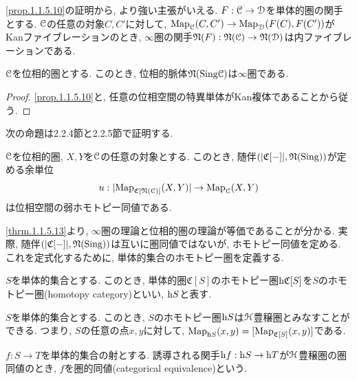 \documentclass[uplatex, a4paper, 14Q, dvipdfmx]{jsreport}
\begin{document}
\begin{remark} \label{rem.1.1.5.11}
  \cref{prop.1.1.5.10}の証明から, より強い主張がいえる.
  $F : \mathcal{C} \to \mathcal{D}$を単体的圏の関手とする. 
  $\mathcal{C}$の任意の対象$C,C'$に対して, $\mathrm{Map}_{\mathcal{C}}(C,C') \to \mathrm{Map}_{\mathcal{D}}(F(C),F(C'))$がKanファイブレーションのとき, $\infty$圏の関手$\mathfrak{N}(F) : \mathfrak{N}(\mathcal{C}) \to \mathfrak{N}(\mathcal{D})$は内ファイブレーションである.  
\end{remark}

\begin{corollary} \label{cor.1.1.5.12}
  $\mathcal{C}$を位相的圏とする. 
  このとき, 位相的脈体$\mathfrak{N}(\mathrm{Sing}\mathcal{C})$は$\infty$圏である.
\end{corollary}

\begin{proof}
  \cref{prop.1.1.5.10}と, 任意の位相空間の特異単体がKan複体であることから従う.
\end{proof}

次の命題は2.2.4節と2.2.5節で証明する. 

\begin{theorem} \label{thrm.1.1.5.13}
  $\mathcal{C}$を位相的圏, $X,Y$を$\mathcal{C}$の任意の対象とする. 
  このとき, 随伴$(|\mathfrak{C}[-]|, \mathfrak{N}(\mathrm{Sing}))$が定める余単位
  \begin{align*}
    u : |\mathrm{Map}_{\mathfrak{C}[\mathfrak{N}(\mathcal{C})]}(X,Y)| \to \mathrm{Map}_{\mathcal{C}}(X,Y)
  \end{align*}
  は位相空間の弱ホモトピー同値である. 
\end{theorem}

\cref{thrm.1.1.5.13}より, $\infty$圏の理論と位相的圏の理論が等価であることが分かる. 
実際, 随伴$(|\mathfrak{C}[-]|, \mathfrak{N}(\mathrm{Sing}))$は互いに圏同値ではないが, ホモトピー同値を定める. 
これを定式化するために, 単体的集合のホモトピー圏を定義する. 

\begin{definition}[単体的集合のホモトピー圏] \label{def.1.1.5.14}
  $S$を単体的集合とする. 
  このとき, 単体的圏$\mathfrak{C}[S]$のホモトピー圏$\mathrm{h}\mathfrak{C}[S]$を$S$のホモトピー圏(homotopy category)といい, $\mathrm{h} S$と表す. 

  $S$を単体的集合とする. 
  このとき, $S$のホモトピー圏$\mathrm{h} S$は$\mathcal{H}$豊穣圏とみなすことができる. 
  つまり, $S$の任意の点$x,y$に対して, $\mathrm{Map}_{\mathrm{h} S}(x,y) = [\mathrm{Map}_{\mathfrak{C}[S]}(x,y)]$である. 

  $f : S \to T$を単体的集合の射とする. 
  誘導される関手$\mathrm{h} f : \mathrm{h} S \to \mathrm{h} T$が$\mathcal{H}$豊穣圏の圏同値のとき, $f$を圏的同値(categorical equivalence)という. 
\end{definition}
\end{document}
